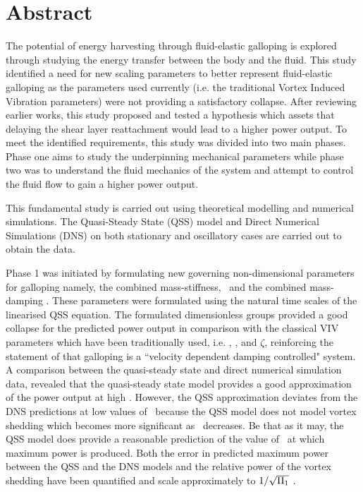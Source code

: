 \chapter*{Abstract}

The potential of energy harvesting through fluid-elastic galloping is explored through studying the energy transfer between the body and the fluid. This study identified a need for new scaling parameters to better represent fluid-elastic galloping as the parameters used currently (i.e. the traditional Vortex Induced Vibration parameters) were not providing a satisfactory collapse. After reviewing earlier works, this study proposed and tested a hypothesis which assets that delaying the shear layer reattachment would lead to a higher power output. To meet the identified requirements, this study was divided into two main phases. Phase one aims to study the underpinning mechanical parameters while phase two was to understand the fluid mechanics of the system and attempt to control the fluid flow to gain a higher power output.

This fundamental study is carried out using theoretical modelling and numerical simulations. The Quasi-Steady State (QSS) model and Direct Numerical Simulations (DNS) on both stationary and oscillatory cases are carried out to obtain the data.


Phase 1 was initiated by formulating new governing non-dimensional parameters for galloping namely, the combined mass-stiffness, \massstiff\, and the combined mass-damping \massdamp. These parameters were formulated using the natural time scales of the linearised QSS equation. The formulated dimensionless groups provided a good collapse for the predicted power output in comparison with the classical VIV parameters which have been traditionally used, i.e. \ustar, \mstar, and $\zeta$, reinforcing the statement of \citet{Paidoussis2010} that galloping is a ``velocity dependent damping controlled" system. 
A comparison between the quasi-steady state and direct numerical simulation data, revealed that the quasi-steady state model provides a good approximation of the power output at high \massstiff. However, the QSS approximation deviates from the DNS predictions at low values of \massstiff\ because the QSS model does not model vortex shedding which becomes more significant as \massstiff\ decreases. Be that as it may, the QSS model does provide a reasonable prediction of the value of \massdamp\ at which maximum power is produced. Both the error in predicted maximum power between the QSS and the DNS models and the relative power of the vortex shedding have been quantified and scale approximately to $1/\sqrt{\Pi_1}$ .

